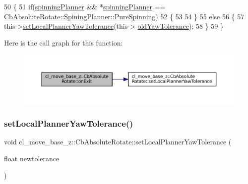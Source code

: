 \begin{DoxyCode}
50 \{
51     \textcolor{keywordflow}{if}(\hyperlink{classcl__move__base__z_1_1CbAbsoluteRotate_a17d836524599af072cf2e3488e491a91}{spinningPlanner} && *\hyperlink{classcl__move__base__z_1_1CbAbsoluteRotate_a17d836524599af072cf2e3488e491a91}{spinningPlanner} == 
      \hyperlink{classcl__move__base__z_1_1CbAbsoluteRotate_ab8d45e43594a3fc6a71c08f07b5dbef0aada5274435681a4ce04175bebfa6652f}{CbAbsoluteRotate::SpiningPlanner::PureSpinning})
52     \{
53 
54     \}
55     \textcolor{keywordflow}{else}
56     \{
57         this->\hyperlink{classcl__move__base__z_1_1CbAbsoluteRotate_aba8d93d615ccd43acd0684f8e88e2209}{setLocalPlannerYawTolerance}(this->
      \hyperlink{classcl__move__base__z_1_1CbAbsoluteRotate_a2cfcd2978e7923494e2e66107e134e27}{oldYawTolerance});
58     \}
59 \}
\end{DoxyCode}
Here is the call graph for this function\+:
\nopagebreak
\begin{figure}[H]
\begin{center}
\leavevmode
\includegraphics[width=350pt]{classcl__move__base__z_1_1CbAbsoluteRotate_a0e362b8e9f0d7de5aeee183ba4031437_cgraph}
\end{center}
\end{figure}
\mbox{\label{classcl__move__base__z_1_1CbAbsoluteRotate_aba8d93d615ccd43acd0684f8e88e2209}} 
\subsubsection{\texorpdfstring{set\+Local\+Planner\+Yaw\+Tolerance()}{setLocalPlannerYawTolerance()}}
{\footnotesize\ttfamily void cl\+\_\+move\+\_\+base\+\_\+z\+::\+Cb\+Absolute\+Rotate\+::set\+Local\+Planner\+Yaw\+Tolerance (\begin{DoxyParamCaption}\item[{float}]{newtolerance }\end{DoxyParamCaption})\hspace{0.3cm}{\ttfamily [private]}}



